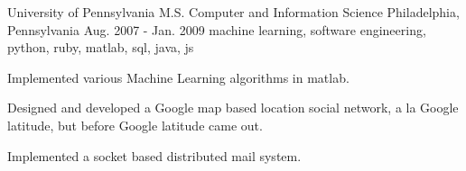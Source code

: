 \cventry
    {University of Pennsylvania} %
    {M.S. Computer and Information Science} %
    {Philadelphia, Pennsylvania} %
    {Aug. 2007 - Jan. 2009} %
    {machine learning, software engineering, python, ruby, matlab, sql, java, js} %
    {
        \vspace{-4.0mm}
        \begin{cvitems} %
        \item {Implemented various Machine Learning algorithms in matlab. }
        \item {Designed and developed a Google map based location social network, a la Google latitude, but before Google latitude came out.
        }
        \item {Implemented a socket based distributed mail system.}
        \end{cvitems}
    }
